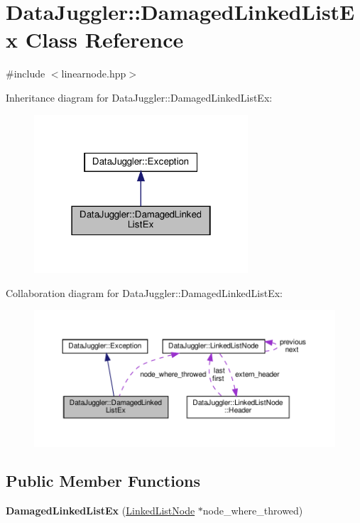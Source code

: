 \hypertarget{classDataJuggler_1_1DamagedLinkedListEx}{}\section{Data\+Juggler\+:\+:Damaged\+Linked\+List\+Ex Class Reference}
\label{classDataJuggler_1_1DamagedLinkedListEx}


{\ttfamily \#include $<$linearnode.\+hpp$>$}



Inheritance diagram for Data\+Juggler\+:\+:Damaged\+Linked\+List\+Ex\+:\nopagebreak
\begin{figure}[H]
\begin{center}
\leavevmode
\includegraphics[width=226pt]{classDataJuggler_1_1DamagedLinkedListEx__inherit__graph}
\end{center}
\end{figure}


Collaboration diagram for Data\+Juggler\+:\+:Damaged\+Linked\+List\+Ex\+:\nopagebreak
\begin{figure}[H]
\begin{center}
\leavevmode
\includegraphics[width=350pt]{classDataJuggler_1_1DamagedLinkedListEx__coll__graph}
\end{center}
\end{figure}
\subsection*{Public Member Functions}
\begin{DoxyCompactItemize}
\item 
\mbox{\label{classDataJuggler_1_1DamagedLinkedListEx_a07957e3a7722d5d7adf90bf013786de8}} 
{\bfseries Damaged\+Linked\+List\+Ex} (\hyperlink{classDataJuggler_1_1LinkedListNode}{Linked\+List\+Node} $\ast$node\+\_\+where\+\_\+throwed)
\end{DoxyCompactItemize}
